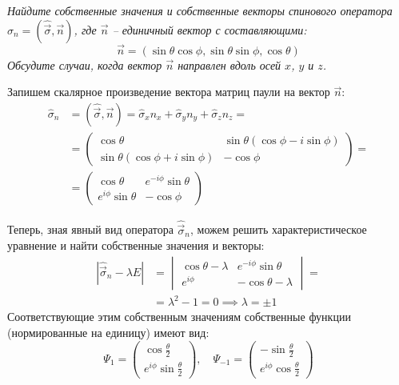 \begin{center}
    \textit{Найдите собственные значения и собственные векторы спинового оператора $\hat{\sigma}_n = (\hat{\Vec{\sigma}}, \Vec{n})$, где $\Vec{n}$ -- единичный вектор с составляющими:}
    \[
    \Vec{n} = (\sin\theta\cos\phi, \sin\theta\sin\phi, \cos\theta)
    \]
    \textit{Обсудите случаи, когда вектор $\Vec{n}$ направлен вдоль осей $x$, $y$ и $z$.}
\end{center}

Запишем скалярное произведение вектора матриц паули на вектор $\Vec{n}$:
\begin{align*}
    \hat{\sigma}_n & = (\hat{\Vec{\sigma}}, \Vec{n})  = \hat{\sigma}_x n_x + \hat{\sigma}_y n_y + \hat{\sigma}_z n_z= \\ 
    & = \begin{pmatrix} \cos\theta & \sin\theta(\cos\phi - i\sin\phi) \\ \sin\theta(\cos\phi + i\sin\phi)  & -\cos\phi \end{pmatrix} = \\ 
    & = \begin{pmatrix} \cos\theta & e^{-i\phi} \sin\theta \\ e^{i\phi} \sin\theta & -\cos\phi \end{pmatrix}
\end{align*}

Теперь, зная явный вид оператора $\hat{\Vec{\sigma}}_n$, можем решить характеристическое уравнение и найти собственные значения и векторы:
\begin{align*}
    |\hat{\Vec{\sigma}}_{n} - \lambda E| & = \begin{vmatrix} \cos\theta - \lambda & e^{-i\phi}\sin\theta \\ e^{i\phi} & -\cos\theta - \lambda \end{vmatrix} = \\ 
    &= \lambda^2 - 1 = 0 \implies \lambda = \pm 1
\end{align*}
Соответствующие этим собственным значениям собственные функции (нормированные на единицу) имеют вид:
\[
\Psi_1 = \begin{pmatrix} \cos \frac{\theta}{2} \\ e^{i\phi} \sin\frac{\theta}{2}\end{pmatrix}, \quad
\Psi_{-1} = \begin{pmatrix} -\sin\frac{\theta}{2} \\ e^{i\phi}\cos\frac{\theta}{2} \end{pmatrix}
\]

